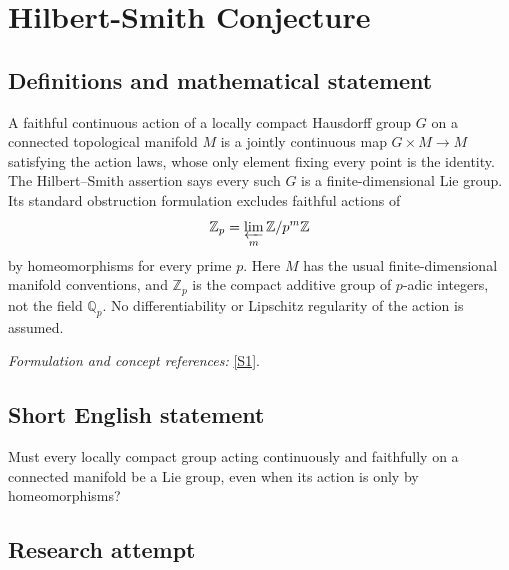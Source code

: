 \documentclass[11pt,a4paper]{article}
\newcommand{\Z}{\mathbb{Z}}
\newcommand{\Q}{\mathbb{Q}}
\newcommand{\sref}[2]{\hyperlink{source:#1:#2}{[S#2]}}
\newif\ifshowcatalogue
\newcommand{\cataloguescope}[1]{\ifshowcatalogue
 \paragraph{Exact scope in the supplied catalogue.}
 \begin{quote}\small #1\end{quote}\fi}
\begin{document}
\setcounter{section}{0}
\clearpage
\section*{\texorpdfstring{Hilbert-Smith Conjecture}{Hilbert-Smith Conjecture}}\label{1482}
\subsection{Definitions and mathematical statement}
A faithful continuous action of a locally compact Hausdorff group $G$ on a connected topological manifold $M$ is a jointly continuous map $G\times M\to M$ satisfying the action laws, whose only element fixing every point is the identity. The Hilbert--Smith assertion says every such $G$ is a finite-dimensional Lie group. Its standard obstruction formulation excludes faithful actions of
\[
 \Z_p=\varprojlim_m\Z/p^m\Z
\]
by homeomorphisms for every prime $p$. Here $M$ has the usual finite-dimensional manifold conventions, and $\Z_p$ is the compact additive group of $p$-adic integers, not the field $\Q_p$. No differentiability or Lipschitz regularity of the action is assumed.
\par\smallskip\textit{Formulation and concept references:} \sref{1482}{1}.
\cataloguescope{Prove that every locally compact topological group acting faithfully on a connected topological manifold is a Lie group; equivalently, prove that Z\_p admits no faithful action by homeomorphisms on a connected manifold.}
\subsection{Short English statement}
Must every locally compact group acting continuously and faithfully on a connected manifold be a Lie group, even when its action is only by homeomorphisms?
\subsection{Research attempt}
\end{document}

